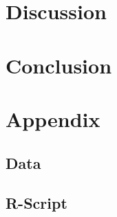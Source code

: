 \documentclass[12pt]{article}
\begin{document}
\section{Discussion}

\section{Conclusion}

\printbibliography

\section*{Appendix}

\subsection*{Data}

\subsection*{R-Script}
   
%
\end{document}
